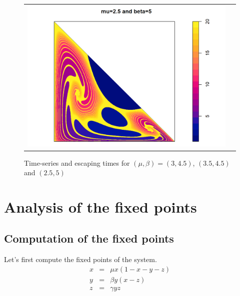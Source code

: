 \documentclass[10pt]{Configuration_Files/PoliMi3i_thesis}
\begin{document}
\begin{figure}[h]
\begin{tabular}{cc}
    \includegraphics[width=0.45\linewidth]{images/Chapter 2/unnamed-chunk-8-1.png}
    \end{tabular}
    \caption{Time-series and escaping times for $(\mu, \beta) = (3, 4.5)$, $(3.5, 4.5)$ and $(2.5, 5)$}
    \label{fig:Iterations}
\end{figure}

\chapter{Analysis of the fixed points}

\section{Computation of the fixed points}

Let's first compute the fixed points of the system. 
\begin{eqnarray}
x & = & \mu x (1-x-y-z) \label{eq:sys1}\\
y & = & \beta y (x-z) \label{eq:sys2}\\
z & = & \gamma y z \label{eq:sys3}
\end{eqnarray}
\end{document}
